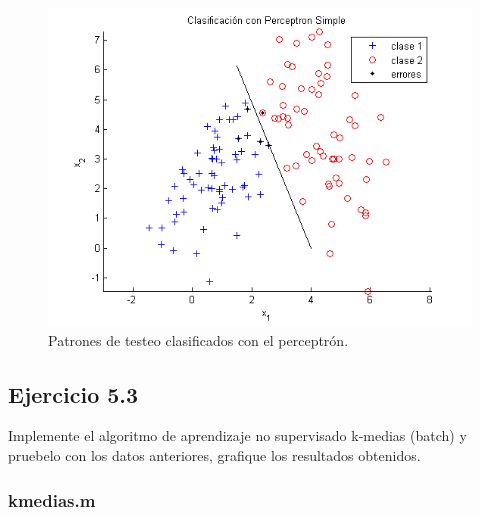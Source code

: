 \documentclass[11pt,a4paper,final]{article}
\begin{document}
\begin{figure}
\includegraphics [width=\textwidth]{Ejercicio5_02.png}
\caption{Patrones de testeo clasificados con el perceptrón.}
\label{fig:ejercicio52}
\end{figure}


\subsection{Ejercicio 5.3}


Implemente el algoritmo de aprendizaje no supervisado k-medias (batch) y pruebelo con los datos anteriores, grafique los resultados obtenidos.

\subsubsection*{kmedias.m}
\end{document}
